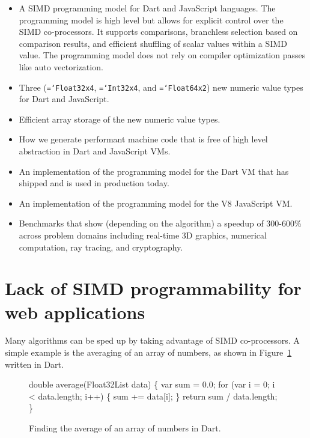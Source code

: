 \documentclass[preprint]{sigplanconf}
\newcommand{\ttt}[1]{{\texttt{\hyphenchar\font=`\-\relax #1}}}%
\begin{document}
\begin{itemize} 
\item
A SIMD programming model for Dart and JavaScript languages. The programming
model is high level but allows for explicit control over the SIMD co-processors.
It supports comparisons, branchless selection based on comparison results, and
efficient shuffling of scalar values within a SIMD value. The programming model
does not rely on compiler optimization passes like auto vectorization.

\item
Three (\ttt{Float32x4}, \ttt{Int32x4}, and \ttt{Float64x2}) new numeric value
types for Dart and JavaScript.

\item
Efficient array storage of the new numeric value types.

\item
How we generate performant machine code that is free of high level abstraction
in Dart and JavaScript VMs.

\item
An implementation of the programming model for the Dart VM that has shipped and
is used in production today.

\item
An implementation of the programming model for the V8 JavaScript VM.

\item
Benchmarks that show (depending on the algorithm) a speedup of 300-600\% across
problem domains including real-time 3D graphics, numerical computation, ray
tracing, and cryptography.
\end{itemize}

\section{Lack of SIMD programmability for web applications}

Many algorithms can be sped up by taking advantage of SIMD co-processors. A
simple example is the averaging of an array of numbers, as shown in
Figure~\ref{fig:scalar-average} written in Dart.

\begin{figure}
\begin{small}
\begin{program}[style=tt, number=true]
do\tab{}uble average(Float32List data) \{
  var sum = 0.0;
  fo\tab{}r (var i = 0; i < data.length; i++) \{
    sum += data[i];\untab{}
  \}
  return sum / data.length;\untab{}
\}
\end{program}
\end{small}
\caption{Finding the average of an array of numbers in Dart.}
\label{fig:scalar-average}
\end{figure}
\end{document}

